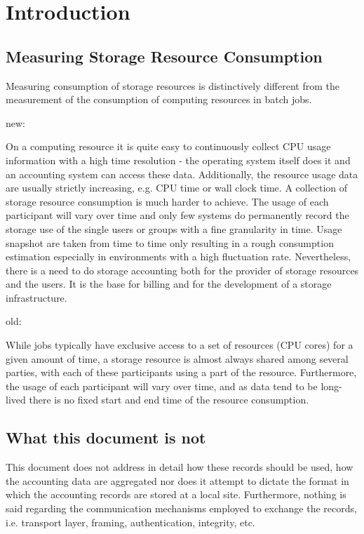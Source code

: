 \section{Introduction}

\subsection{Measuring Storage Resource Consumption}

Measuring consumption of storage resources is distinctively different from
the measurement of the consumption of computing resources in batch jobs. 

new:

On a computing resource it is quite easy to continuously collect CPU 
usage information with a high time resolution - the operating system itself does 
it and an accounting system can access these data. Additionally,
the resource usage data are usually strictly increasing, e.g. 
CPU time or wall clock time.
A collection of storage resource consumption is much harder
to achieve. The usage of each participant will vary over time and only few 
systems do permanently record the storage use of the single users or 
groups with a fine granularity in time. 
Usage snapshot are taken from time to time only
resulting in a rough consumption estimation especially in environments
with a high fluctuation rate. 
Nevertheless, there is a need to do storage accounting both for the provider
of storage resources and the users. It is the base for billing and for 
the development of a storage infrastructure.

old:

While jobs typically have exclusive access
to a set of resources (CPU cores) for a given amount of time, a storage
resource is almost always shared
among several parties, with each of these participants using a part of the
resource. Furthermore, the usage of each participant will vary over time, and as
data tend to be long-lived there is no fixed start and end time of the resource
consumption.


\subsection{What this document is not}
This document does not address in detail how these records should be used, 
how the accounting data are aggregated 
nor does it attempt to dictate the format in which the accounting records are 
stored at a local site. 
Furthermore, nothing is said regarding the communication mechanisms
employed to exchange the records, i.e. transport layer, framing, 
authentication, integrity, etc.


